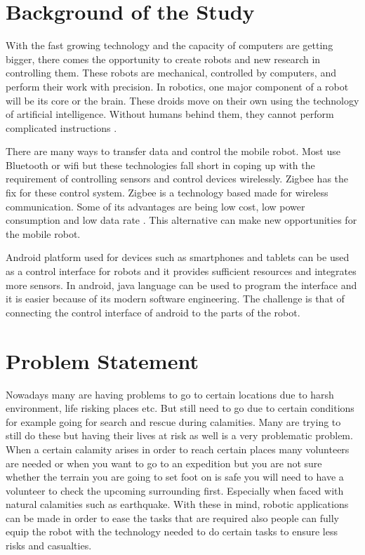 \section{Background of the Study}

With the fast growing technology and the capacity of computers are getting bigger, there comes the opportunity to create robots and new research in controlling them. These robots are mechanical, controlled by computers, and perform their work with precision. In robotics, one major component of a robot will be its core or the brain. These droids move on their own using the technology of artificial intelligence. Without humans behind them, they cannot perform complicated instructions \cite{Bharathi2013}. 

There are many ways to transfer data and control the mobile robot. Most use Bluetooth or wifi but these technologies fall short in coping up with the requirement of controlling sensors and control devices wirelessly. Zigbee has the fix for these control system. Zigbee is a technology based made for wireless communication. Some of its advantages are being low cost, low power consumption and low data rate \cite{Bharathi2013}. This alternative can make new opportunities for the mobile robot.

Android platform used for devices such as smartphones and tablets can be used as a control interface for robots and it provides sufficient resources and integrates more sensors. In android, java language can be used to program the interface and it is easier because of its modern software engineering. The challenge is that of connecting the control interface of android to the parts of the robot. 

\section{Problem Statement}

Nowadays many are having problems to go to certain locations due to harsh environment, life risking places etc. But still need to go due to certain conditions for example going for search and rescue during calamities. Many are trying to still do these but having their lives at risk as well is a very problematic problem. When a certain calamity arises in order to reach certain places many volunteers are needed or when you want to go to an expedition but you are not sure whether the terrain you are going to set foot on is safe you will need to have a volunteer to check the upcoming surrounding first. Especially when faced with natural calamities such as earthquake. With these in mind, robotic applications can be made in order to ease the tasks that are required also people can fully equip the robot with the technology needed to do certain tasks to ensure less risks and casualties.


